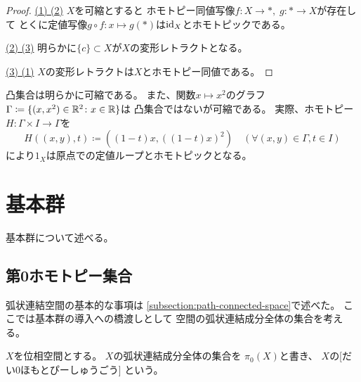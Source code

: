 \documentclass[report]{jlreq}
\begin{document}
\begin{proof}
    \uline{(1) \Rightarrow (2)} \quad
    $X$を可縮とすると
    ホモトピー同値写像$f \colon X \to *, \; g \colon * \to X$が存在して
    とくに定値写像$g \circ f \colon x \mapsto g(*)$は$\mathrm{id}_X$とホモトピックである。

    \uline{(2) \Rightarrow (3)} \quad
    明らかに$\{ c \} \subset X$が$X$の変形レトラクトとなる。

    \uline{(3) \Rightarrow (1)} \quad
    $X$の変形レトラクトは$X$とホモトピー同値である。
\end{proof}

\begin{example}[可縮空間の例]
    凸集合は明らかに可縮である。
    また、関数$x \mapsto x^2$のグラフ$\Gamma \coloneqq \{ (x, x^2) \in \mathbb{R}^2 \colon x \in \mathbb{R} \}$は
    凸集合ではないが可縮である。
    実際、ホモトピー$H \colon \Gamma \times I \to \Gamma$を
    \begin{equation}
        H((x, y), t) \coloneqq ((1 - t) x, ((1 - t) x)^2) \quad (\forall (x, y) \in \Gamma, t \in I)
    \end{equation}
    により$1_X$は原点での定値ループとホモトピックとなる。
\end{example}



%
\section{基本群}

基本群について述べる。

\subsection{第0ホモトピー集合}

弧状連結空間の基本的な事項は
\cref{subsection:path-connected-space}で述べた。
ここでは基本群の導入への橋渡しとして
空間の弧状連結成分全体の集合を考える。

\begin{definition}[第0ホモトピー集合]
    $X$を位相空間とする。
    $X$の弧状連結成分全体の集合を
    $\pi_0(X)$と書き、
    $X$の[だい0ほもとぴーしゅうごう]
    という。
\end{definition}
\end{document}
